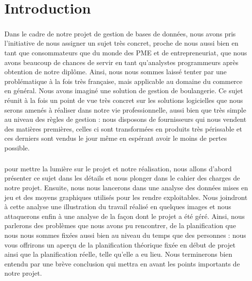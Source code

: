 \chapter*{Introduction}

\paragraph{}
    Dans le cadre de notre projet de gestion de bases de données,
    nous avons pris l'initiative de nous assigner un sujet très concret,
    proche de nous aussi bien en tant que consommateurs que du monde des PME et
    de entrepreneuriat, que nous avons beaucoup de chances de servir en tant
    qu'analystes programmeurs après obtention de notre diplôme.
    Ainsi, nous nous sommes laissé tenter par une problématique à la fois très
    française, mais applicable au domaine du commerce en général.
    Nous avons imaginé une solution de gestion de boulangerie.
    Ce sujet réunit à la fois un point de vue très concret sur les solutions
    logicielles que nous serons amenés à réaliser dans notre vie
    professionnelle, aussi bien que très simple au niveau des règles de
    gestion : nous disposons de fournisseurs qui nous vendent des matières
    premières, celles ci sont transformées en produits très périssable et ces
    derniers sont vendus le jour même en espérant avoir le moins de pertes
    possible.
\paragraph{}
    pour mettre la lumière sur le projet et notre réalisation, nous allons 
    d'abord présenter ce sujet dans les détails et nous plonger dans le cahier
    des charges de notre projet. Ensuite, nous nous lancerons dans une analyse
    des données mises en jeu et des moyens graphiques utilisés pour
    les rendre exploitables.
    Nous joindront à cette analyse une illustration du travail réalisé en
    quelques images et nous attaquerons enfin à une analyse de la façon dont le
    projet a été géré. Ainsi, nous parlerons des problèmes que nous avons pu
    rencontrer, de la planification que nous nous sommes fixées aussi bien au
    niveau du temps que des personnes : nous vous offrirons un aperçu de la 
    planification théorique fixée en début de projet ainsi que la planification
    réelle, telle qu'elle a eu lieu. Nous terminerons bien entendu par une
    brève conclusion qui mettra en avant les points importants de notre projet.
